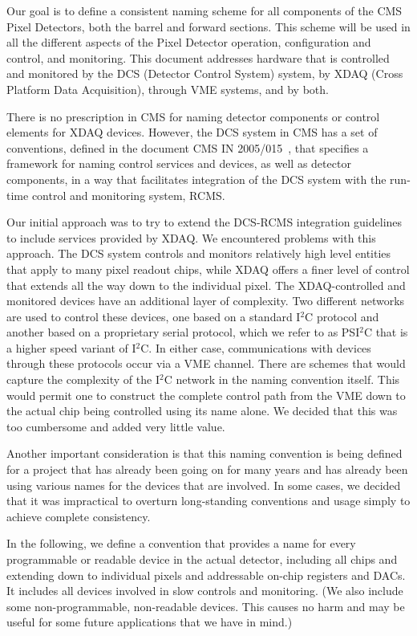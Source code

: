 \documentclass{cmspaper}
\begin{document}
Our goal is to define a  consistent naming scheme for all 
components of the CMS Pixel Detectors, both the barrel and forward sections. 
This scheme will be  used in all the different 
aspects of the Pixel Detector operation, configuration and control, 
and monitoring. This document addresses hardware that is controlled and 
monitored by the DCS (Detector Control System) system, by XDAQ (Cross Platform
Data Acquisition), through VME systems, and by both.



There is no prescription in CMS for naming detector components or control 
elements for XDAQ devices. However, the DCS system in CMS has a set of 
conventions, defined in the document CMS IN 2005/015~\cite{integration}, 
that specifies a framework for 
naming control services and devices, as well as 
detector components, in a way that facilitates integration of the DCS system 
with the run-time control and monitoring system, RCMS. 


Our initial approach was to try to
extend the DCS-RCMS integration guidelines to include services provided by
XDAQ. 
We encountered problems with this approach. The DCS system controls and 
monitors relatively high level entities that 
apply to many pixel readout chips, while XDAQ offers a finer level of control 
that  extends all the way down to the individual pixel. The XDAQ-controlled
and monitored devices have an additional layer of complexity. 
Two different networks are used to control these devices, 
one based on a standard I$^{2}$C protocol and another based on a 
proprietary serial protocol, which we refer to as PSI$^{2}$C that is a higher
speed variant of I$^{2}$C. In either case, communications with devices through
these protocols occur via a VME channel.
There are schemes that would capture the  complexity of the 
I$^{2}$C network in the naming convention itself. This would permit one to 
construct  the complete control path from the VME down to the actual chip
being controlled using its  name alone.
We decided that this was too cumbersome and added very 
little value. 

Another important consideration is that this naming convention is being
defined for a project that has already been going on for many years and has 
already been using various names for the devices that are involved. 
In some cases, we decided that it was impractical to overturn long-standing 
conventions and usage simply to  achieve complete consistency. 

In the following, we define a convention that provides a name for every 
programmable or readable device
in the actual detector, including all chips and extending down to individual 
pixels and
addressable on-chip registers and DACs. It includes all devices
involved in slow  controls and monitoring. (We also include some 
non-programmable, non-readable devices. This causes no harm and
may be useful for  some future applications that we have in mind.)
\end{document}
